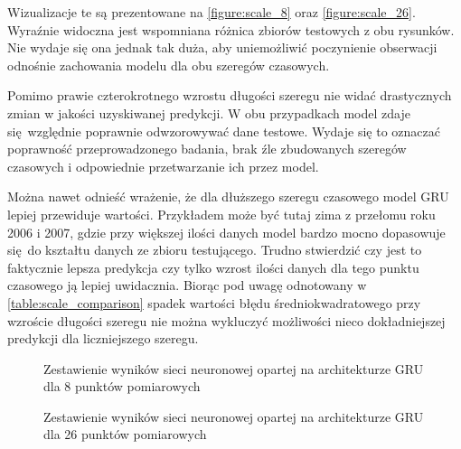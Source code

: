 \documentclass[10pt,a4paper]{article}
\begin{document}
Wizualizacje te są prezentowane na \autoref{figure:scale_8} oraz \autoref{figure:scale_26}. Wyraźnie widoczna jest wspomniana różnica zbiorów testowych z obu rysunków. Nie wydaje się ona jednak tak duża, aby uniemożliwić poczynienie obserwacji odnośnie zachowania modelu dla obu szeregów czasowych.

Pomimo prawie czterokrotnego wzrostu długości szeregu nie widać drastycznych zmian w jakości uzyskiwanej predykcji. W obu przypadkach model zdaje się względnie poprawnie odwzorowywać dane testowe. Wydaje się to oznaczać poprawność przeprowadzonego badania, brak źle zbudowanych szeregów czasowych i odpowiednie przetwarzanie ich przez model. 

Można nawet odnieść wrażenie, że dla dłuższego szeregu czasowego model GRU lepiej przewiduje wartości. Przykładem może być tutaj zima z przełomu roku 2006 i 2007, gdzie przy większej ilości danych model bardzo mocno dopasowuje się do kształtu danych ze zbioru testującego. Trudno stwierdzić czy jest to faktycznie lepsza predykcja czy tylko wzrost ilości danych dla tego punktu czasowego ją lepiej uwidacznia. Biorąc pod uwagę odnotowany w \autoref{table:scale_comparison} spadek wartości błędu średniokwadratowego przy wzroście długości szeregu nie można wykluczyć możliwości nieco dokładniejszej predykcji dla liczniejszego szeregu. 

\begin{figure}[!ht]
	\centering
	\caption{Zestawienie wyników sieci neuronowej opartej na architekturze GRU dla 8 punktów pomiarowych}
	\label{figure:scale_8}
\end{figure}
\FloatBarrier

\begin{figure}[!ht]
	\centering
	\caption{Zestawienie wyników sieci neuronowej opartej na architekturze GRU dla 26 punktów pomiarowych}
	\label{figure:scale_26}
\end{figure}
\FloatBarrier
\end{document}
